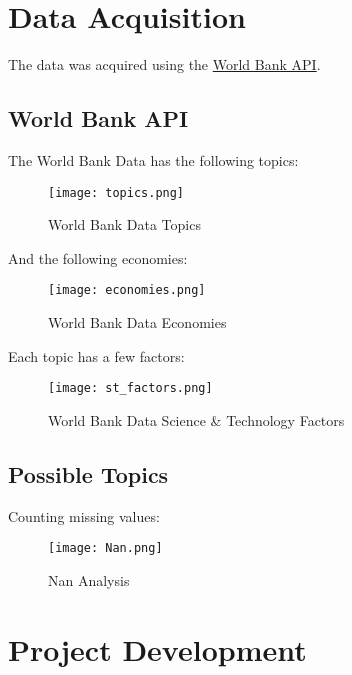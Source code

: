\documentclass{other/docTemplate}
\begin{document}
\section{Data Acquisition}
The data was acquired using the \href{https://datahelpdesk.worldbank.org/knowledgebase/topics/125589}{World Bank API}.


\subsection{World Bank API}

The World Bank Data has the following topics:

\begin{figure}[htbp!]
  \centering
  \texttt{[image: topics.png]}
  \caption{World Bank Data Topics}
  \label{fig:topics}
\end{figure}

And the following economies:

\begin{figure}[htbp!]
  \centering
  \texttt{[image: economies.png]}
  \caption{World Bank Data Economies}
  \label{fig:economies}
\end{figure}

Each topic has a few factors:

\begin{figure}[htbp!]
  \centering
  \texttt{[image: st\_factors.png]}
  \caption{World Bank Data Science \& Technology Factors}
  \label{fig:stfactors}
\end{figure}


\subsection{Possible Topics}

Counting missing values:

\begin{figure}[htbp!]
  \centering
  \texttt{[image: Nan.png]}
  \caption{Nan Analysis}
  \label{fig:nan}
\end{figure}

\clearpage
\section{Project Development} 
\end{document}
